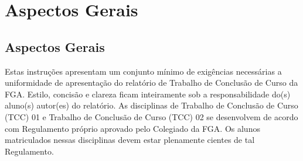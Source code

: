 \part{Aspectos Gerais}
\chapter[Aspectos Gerais]{Aspectos Gerais}
Estas instruções apresentam um conjunto mínimo de exigências necessárias a
uniformidade de apresentação do relatório de Trabalho de Conclusão de Curso
da FGA. Estilo, concisão e clareza ficam inteiramente sob a
responsabilidade do(s) aluno(s) autor(es) do relatório.
As disciplinas de Trabalho de Conclusão de Curso (TCC) 01 e Trabalho de
Conclusão de Curso (TCC) 02 se desenvolvem de acordo com Regulamento
próprio aprovado pelo Colegiado da FGA. Os alunos matriculados nessas
disciplinas devem estar plenamente cientes de tal Regulamento.
